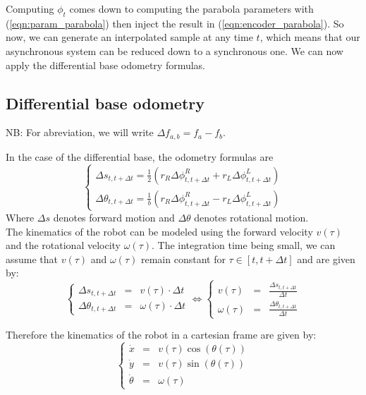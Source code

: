 \documentclass[a4paper, 10pt]{article}
\begin{document}
Computing $\phi_t$ comes down to computing the parabola parameters with (\ref{eqn:param_parabola}) then inject the result in (\ref{eqn:encoder_parabola}).
So now, we can generate an interpolated sample at any time $t$, which means that our asynchronous system can be reduced down to a synchronous one.
We can now apply the differential base odometry formulas.

\subsection{Differential base odometry}
NB: For abreviation, we will write $\Delta f_{a,b} = f_a - f_b$.

In the case of the differential base, the odometry formulas are
\begin{equation}
\left\{
\begin{array}{lr}
    \Delta s_{t,t+\Delta t} = \frac{1}{2} (r_R \Delta \phi_{t,t+\Delta t}^R + r_L \Delta \phi_{t,t+\Delta t}^L) \\
    \Delta \theta_{t,t+\Delta t}  = \frac{1}{b} (r_R \Delta \phi_{t,t+\Delta t}^R - r_L \Delta \phi_{t,t+\Delta t}^L)
\end{array}
\right.
\end{equation}
Where $\Delta s$ denotes forward motion and $\Delta \theta$ denotes rotational motion.
\\
The kinematics of the robot can be modeled using the forward velocity $v(\tau)$ and the rotational velocity $\omega(\tau)$.
The integration time being small, we can assume that $v(\tau)$ and $\omega(\tau)$ remain constant for $\tau \in [t, t+\Delta t]$ and are given by:
\begin{equation}
\left\{
\begin{array}{lcl}
    \Delta s_{t,t+\Delta t} &=& v(\tau) \cdot \Delta t \\
    \Delta \theta_{t,t+\Delta t} &=& \omega(\tau) \cdot \Delta t
\end{array}
\right.
\iff
\left\{
\begin{array}{lcl}
    v(\tau) &=&  \frac{\Delta s_{t,t+\Delta t}}{\Delta t} \\
    \omega(\tau) &=& \frac{\Delta \theta_{t,t+\Delta t}}{\Delta t}
\end{array}
\right.
\label{eqn:discrete_speeds}
\end{equation}

Therefore the kinematics of the robot in a cartesian frame are given by:
\begin{equation}
\left\{
\begin{array}{lcl}
    \dot x &=& v(\tau) \cos(\theta(\tau)) \\
    \dot y &=& v(\tau) \sin(\theta(\tau)) \\
    \dot \theta &=& \omega(\tau)
\end{array}
\right.
\end{equation}
\end{document}
